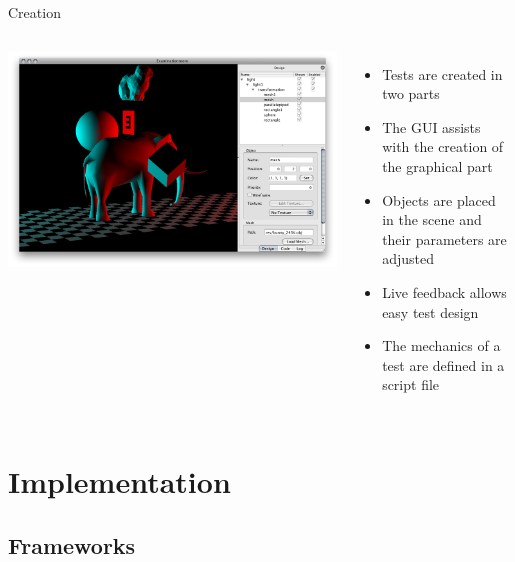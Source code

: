\documentclass[12pt,ucs,hyperref={pdftext}]{beamer}
\newlength{\columnleft}
\newlength{\columnright}
\begin{document}
\begin{frame}{Creation}
\begin{columns}

\column{\columnleft}
\includegraphics[width=\columnleft]{screenshots/er_tree_screenshot.png}

\column{\columnright}
\begin{itemize}%
\item Tests are created in two parts
\item The GUI assists with the creation of the graphical part
\item Objects are placed in the scene and their parameters are adjusted
\item Live feedback allows easy test design
\item The mechanics of a test are defined in a script file
\end{itemize}

\end{columns}
\end{frame}


\section{Implementation}


\subsection{Frameworks}
\end{document}
